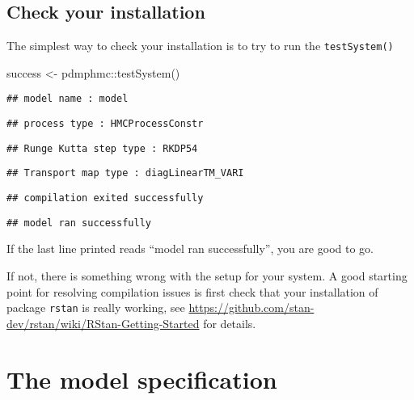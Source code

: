 \documentclass[
]{book}
\newenvironment{Shaded}{\begin{snugshade}}{\end{snugshade}}
\newcommand{\FunctionTok}[1]{\textcolor[rgb]{0.00,0.00,0.00}{#1}}
\newcommand{\NormalTok}[1]{#1}
\newcommand{\OtherTok}[1]{\textcolor[rgb]{0.56,0.35,0.01}{#1}}
\newcommand{\SpecialCharTok}[1]{\textcolor[rgb]{0.00,0.00,0.00}{#1}}
\begin{document}
\hypertarget{check-your-installation}{%
\section{Check your installation}\label{check-your-installation}}

The simplest way to check your installation is to try to run the \texttt{testSystem()}

\begin{Shaded}
\begin{Highlighting}[]
\NormalTok{success }\OtherTok{\textless{}{-}}\NormalTok{ pdmphmc}\SpecialCharTok{::}\FunctionTok{testSystem}\NormalTok{()}
\end{Highlighting}
\end{Shaded}

\begin{verbatim}
## model name : model
\end{verbatim}

\begin{verbatim}
## process type : HMCProcessConstr
\end{verbatim}

\begin{verbatim}
## Runge Kutta step type : RKDP54
\end{verbatim}

\begin{verbatim}
## Transport map type : diagLinearTM_VARI
\end{verbatim}

\begin{verbatim}
## compilation exited successfully
\end{verbatim}

\begin{verbatim}
## model ran successfully
\end{verbatim}

If the last line printed reads ``model ran successfully'', you are good to go.

If not, there is something wrong with the setup for your system. A good starting point for resolving compilation issues is first check that your installation of package \texttt{rstan} is really working, see \url{https://github.com/stan-dev/rstan/wiki/RStan-Getting-Started} for details.

\hypertarget{the-model-specification}{%
\chapter{The model specification}\label{the-model-specification}}
\end{document}
